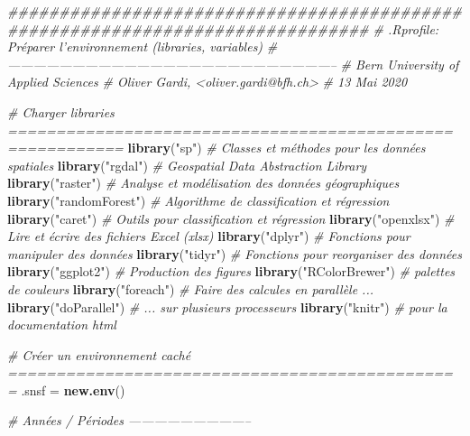 \documentclass[a4paper, notitlepage, 12pt, krantz2]{krantz}
\newenvironment{Shaded}{\begin{snugshade}}{\end{snugshade}}
\newcommand{\CommentTok}[1]{\textcolor[rgb]{0.56,0.35,0.01}{\textit{#1}}}
\newcommand{\KeywordTok}[1]{\textcolor[rgb]{0.13,0.29,0.53}{\textbf{#1}}}
\newcommand{\NormalTok}[1]{#1}
\newcommand{\StringTok}[1]{\textcolor[rgb]{0.31,0.60,0.02}{#1}}
\begin{document}
\begin{Shaded}
\begin{Highlighting}[]
\CommentTok{###############################################################################}
\CommentTok{# .Rprofile: Préparer l'environnement (libraries, variables)}
\CommentTok{# -----------------------------------------------------------------------------}
\CommentTok{# Bern University of Applied Sciences}
\CommentTok{# Oliver Gardi, <oliver.gardi@bfh.ch>}
\CommentTok{# 13 Mai 2020}


\CommentTok{# Charger libraries  ==========================================================}
\KeywordTok{library}\NormalTok{(}\StringTok{"sp"}\NormalTok{)           }\CommentTok{# Classes et méthodes pour les données spatiales}
\KeywordTok{library}\NormalTok{(}\StringTok{"rgdal"}\NormalTok{)        }\CommentTok{# Geospatial Data Abstraction Library}
\KeywordTok{library}\NormalTok{(}\StringTok{"raster"}\NormalTok{)       }\CommentTok{# Analyse et modélisation des données géographiques}
\KeywordTok{library}\NormalTok{(}\StringTok{"randomForest"}\NormalTok{) }\CommentTok{# Algorithme de classification et régression}
\KeywordTok{library}\NormalTok{(}\StringTok{"caret"}\NormalTok{)        }\CommentTok{# Outils pour classification et régression}
\KeywordTok{library}\NormalTok{(}\StringTok{"openxlsx"}\NormalTok{)     }\CommentTok{# Lire et écrire des fichiers Excel (xlsx)}
\KeywordTok{library}\NormalTok{(}\StringTok{"dplyr"}\NormalTok{)        }\CommentTok{# Fonctions pour manipuler des données}
\KeywordTok{library}\NormalTok{(}\StringTok{"tidyr"}\NormalTok{)        }\CommentTok{# Fonctions pour reorganiser des données}
\KeywordTok{library}\NormalTok{(}\StringTok{"ggplot2"}\NormalTok{)      }\CommentTok{# Production des figures}
\KeywordTok{library}\NormalTok{(}\StringTok{"RColorBrewer"}\NormalTok{) }\CommentTok{# palettes de couleurs}
\KeywordTok{library}\NormalTok{(}\StringTok{"foreach"}\NormalTok{)      }\CommentTok{# Faire des calcules en parallèle ...}
\KeywordTok{library}\NormalTok{(}\StringTok{"doParallel"}\NormalTok{)   }\CommentTok{# ... sur plusieurs processeurs}
\KeywordTok{library}\NormalTok{(}\StringTok{"knitr"}\NormalTok{)        }\CommentTok{# pour la documentation html}


\CommentTok{# Créer un environnement caché  ===============================================}
\NormalTok{.snsf =}\StringTok{ }\KeywordTok{new.env}\NormalTok{()}

\CommentTok{# Années / Périodes -----------------------------}


\end{Highlighting}
\end{Shaded}
\end{document}
